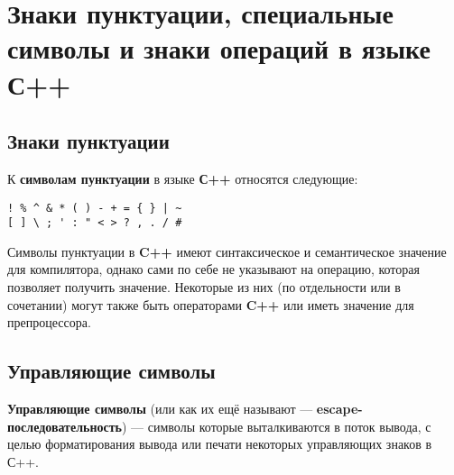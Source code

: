\section{Знаки пунктуации, специальные символы и знаки операций в языке
С++}\label{ux437ux43dux430ux43aux438-ux43fux443ux43dux43aux442ux443ux430ux446ux438ux438-ux441ux43fux435ux446ux438ux430ux43bux44cux43dux44bux435-ux441ux438ux43cux432ux43eux43bux44b-ux438-ux437ux43dux430ux43aux438-ux43eux43fux435ux440ux430ux446ux438ux439-ux432-ux44fux437ux44bux43aux435-ux441}

\subsection{Знаки
пунктуации}\label{ux437ux43dux430ux43aux438-ux43fux443ux43dux43aux442ux443ux430ux446ux438ux438}

К \textbf{символам пунктуации} в языке \textbf{С++} относятся следующие:
\begin{verbatim}
! % ^ & * ( ) - + = { } | ~
[ ] \ ; ' : " < > ? , . / #
\end{verbatim}

Символы пунктуации в \textbf{C++} имеют синтаксическое и семантическое
значение для компилятора, однако сами по себе не указывают на операцию,
которая позволяет получить значение. Некоторые из них (по отдельности
или в сочетании) могут также быть операторами \textbf{C++} или иметь
значение для препроцессора.

\subsection{Управляющие
символы}\label{ux443ux43fux440ux430ux432ux43bux44fux44eux449ux438ux435-ux441ux438ux43cux432ux43eux43bux44b}

\textbf{Управляющие символы} (или как их ещё называют ---
\textbf{escape-последовательность}) --- символы которые выталкиваются в
поток вывода, с целью форматирования вывода или печати некоторых
управляющих знаков в С++.


